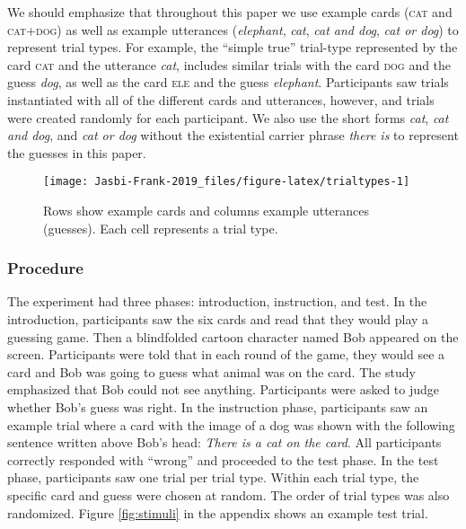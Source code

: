 \documentclass[
  english,
  ,man,floatsintext]{apa6}
\begin{document}
We should emphasize that throughout this paper we use example cards (\textsc{cat} and \textsc{cat+dog}) as well as example utterances (\emph{elephant}, \emph{cat}, \emph{cat and dog}, \emph{cat or dog}) to represent trial types. For example, the \enquote{simple true} trial-type represented by the card \textsc{cat} and the utterance \emph{cat}, includes similar trials with the card \textsc{dog} and the guess \emph{dog}, as well as the card \textsc{ele} and the guess \emph{elephant}. Participants saw trials instantiated with all of the different cards and utterances, however, and trials were created randomly for each participant. We also use the short forms \emph{cat}, \emph{cat and dog}, and \emph{cat or dog} without the existential carrier phrase \emph{there is} to represent the guesses in this paper.

\begin{figure}

{\centering \texttt{[image: Jasbi-Frank-2019\_files/figure-latex/trialtypes-1]} 

}

\caption{Rows show example cards and columns example utterances (guesses). Each cell represents a trial type.}\label{fig:trialtypes}
\end{figure}

\hypertarget{procedure}{%
\subsubsection{Procedure}\label{procedure}}

The experiment had three phases: introduction, instruction, and test. In the introduction, participants saw the six cards and read that they would play a guessing game. Then a blindfolded cartoon character named Bob appeared on the screen. Participants were told that in each round of the game, they would see a card and Bob was going to guess what animal was on the card. The study emphasized that Bob could not see anything. Participants were asked to judge whether Bob's guess was right. In the instruction phase, participants saw an example trial where a card with the image of a dog was shown with the following sentence written above Bob's head: \emph{There is a cat on the card}. All participants correctly responded with \enquote{wrong} and proceeded to the test phase. In the test phase, participants saw one trial per trial type. Within each trial type, the specific card and guess were chosen at random. The order of trial types was also randomized. Figure \ref{fig:stimuli} in the appendix shows an example test trial.
\end{document}

